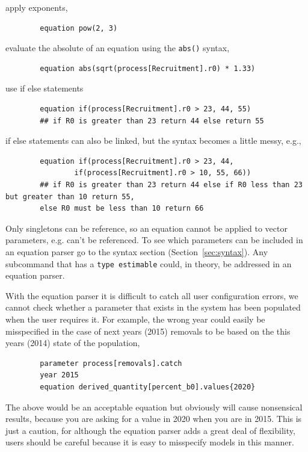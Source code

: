 apply exponents,
{\small{\begin{verbatim}
		equation pow(2, 3)
		\end{verbatim}}}

evaluate the absolute of an equation using the \texttt{abs()} syntax,
{\small{\begin{verbatim}
		equation abs(sqrt(process[Recruitment].r0) * 1.33)
		\end{verbatim}}}
	
use if else statements
{\small{\begin{verbatim}
		equation if(process[Recruitment].r0 > 23, 44, 55)
		## if R0 is greater than 23 return 44 else return 55
		\end{verbatim}}}
	
if else statements can also be linked, but the syntax becomes a little messy, e.g.,
{\small{\begin{verbatim}
		equation if(process[Recruitment].r0 > 23, 44, 
         		if(process[Recruitment].r0 > 10, 55, 66))
		## if R0 is greater than 23 return 44 else if R0 less than 23 but greater than 10 return 55, 
		else R0 must be less than 10 return 66
		\end{verbatim}}}

Only singletons can be reference, so an equation cannot be applied to vector parameters, e.g.  can't be referenced. To see which parameters can be included in an equation parser go to the syntax section (Section~\ref{sec:syntax}). Any subcommand that has a \texttt{type estimable} could, in theory, be addressed in an equation parser.

With the equation parser it is difficult to catch all user configuration errors, we cannot check whether a parameter that exists in the system has been populated when the user requires it. For example, the wrong year could easily be misspecified in the case of next years (2015) removals to be based on the this years (2014) state of the population,
{\small{\begin{verbatim}
		parameter process[removals].catch
		year 2015
		equation derived_quantity[percent_b0].values{2020}
		\end{verbatim}}}
	
The above would be an acceptable equation but obviously will cause nonsensical results, because you are asking for a value in 2020 when you are in 2015. This is just a caution, for although the equation parser adds a great deal of flexibility, users should be careful because it is easy to misspecify models in this manner.

